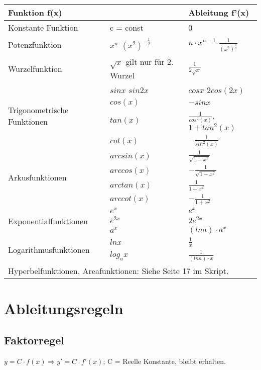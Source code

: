 \begin{longtable}{|l|l|l|}
	\hline
	\multicolumn{2}{|l|}{Funktion f(x)}  & Ableitung f'(x) \\
	\hline
	Konstante Funktion & c = const & 0 \\
	\hline
	Potenzfunktion & \(x^n\) \newline \((x^2)^{-\frac{1}{2}} \) & \(n \cdot x^{n-1}\) \newline \(\frac{1}{(x^{2})^{\frac{1}{2}}}\) \\
	\hline
	Wurzelfunktion & \(\sqrt{x}\) gilt nur für 2. Wurzel & \(\frac{1}{2 \sqrt{x}}\) \\
	\hline
	\multirow{4}{*}{Trigonometrische Funktionen} & \(sin x\) \newline \(sin 2x\) & \(cos x\) \newline \(2 cos (2x)\) \\ \cline{2-3}
	& \(cos(x)\)  & \(-sin x\) \\ \cline{2-3}
	& \(tan(x)\) & \(\frac{1}{cos^2(x)}\), \( 1 + tan^2(x) \) \\ \cline{2-3}
	& \(cot(x)\) & \(-\frac{1}{sin^2(x)}\) \\
	\hline
	\multirow{4}{*}{Arkusfunktionen} & \(arcsin(x)\) & \(\frac{1}{\sqrt{1 - x^2}} \) \\ \cline{2-3}
	& \(arccos(x)\) & \(-\frac{1}{\sqrt{1-x^2}}\) \\ \cline{2-3}
	& \(arctan(x)\) & \(\frac{1}{1+x^2}\) \\ \cline{2-3}
	& \(arccot(x)\) & \(-\frac{1}{1+x^2}\) \\
	\hline
	\multirow{3}{*}{Exponentialfunktionen} & \(e^x\) & \( e^x \) \\ \cline{2-3}
	& \(e^{2x}\) & \( 2e^{2x} \) \\ \cline{2-3}
	& \(a^x\) & \((ln a) \cdot a^x \) \\ \hline
	\multirow{2}{*}{Logarithmusfunktionen} & \(ln x\) & \( \frac{1}{x} \) \\ \cline{2-3}
	& \(log_a x\) & \( \frac{1}{(ln a) \cdot x } \) \\ \hline
	\multicolumn{3}{|l|}{Hyperbelfunktionen, Areafunktionen: Siehe Seite 17 im Skript.} \\ \hline
\end{longtable}

\section{Ableitungsregeln}
\subsection{Faktorregel}
\(y = C \cdot f(x) \Rightarrow y' = C \cdot f'(x)\); C = Reelle Konstante, bleibt erhalten.
